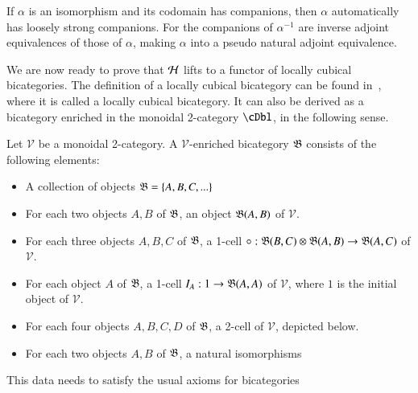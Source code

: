 \begin{rmk}\label{thm:iso-strong}
  If $\alpha$ is an isomorphism and its codomain has companions, then $\alpha$ automatically has loosely strong companions.
  For the companions of $\alpha^{-1}$ are inverse adjoint equivalences of those of $\alpha$, making $\alpha$ into a pseudo natural adjoint equivalence.
\end{rmk}

We are now ready to prove that $\mathcal{H}$ lifts to a functor of locally cubical bicategories. The definition of a locally cubical bicategory can be found in~\cite{gg:ldstr-tricat}, where it is called a locally cubical bicategory. It can also be derived as a bicategory enriched in the monoidal 2-category $\cDbl$, in the following sense.

\begin{defn}\label{def:lcbc}
Let $\mathcal{V}$ be a monoidal 2-category. A $\mathcal{V}$-enriched bicategory $\mathfrak{B}$ consists of the following elements:
\begin{itemize}
\item A collection of objects $\mathfrak{B}=\{A,B,C,...\} $
\item For each two objects $A,B$ of $\mathfrak{B}$, an object $\mathfrak{B}(A,B)$ of $\mathcal{V}$. 
\item For each three objects $A, B, C$ of $\mathfrak{B}$, a 1-cell  $\circ: \mathfrak{B}(B,C) \otimes \mathfrak{B}(A,B) \rightarrow \mathfrak{B}(A,C)$ of $\mathcal{V}$. 
\item For each object $A$ of $\mathfrak{B}$, a 1-cell \newline $I_A: 1 \rightarrow \mathfrak{B}(A,A)$ of $\mathcal{V}$, where $1$ is the initial object of $\mathcal{V}$. 
\item For each four objects $A,B,C,D$ of $\mathfrak{B}$, a 2-cell of $\mathcal{V}$, depicted below. 
  \begin{center}
    
    \end{center}
\item For each two objects $A,B$ of $\mathfrak{B}$, a natural isomorphisms 
  \begin{center}
    
    \end{center}
 \end{itemize}
This data needs to satisfy the usual axioms for bicategories~\cite{maclane}
\end{defn}

